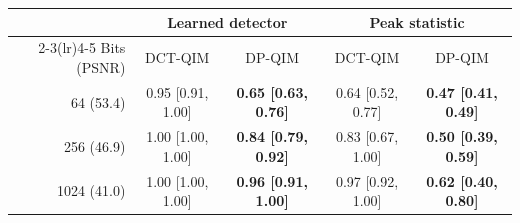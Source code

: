 \begin{tabular}{rcccc}
\toprule
 & \multicolumn{2}{c}{Learned detector} & \multicolumn{2}{c}{Peak statistic} \\
\cmidrule(lr){2-3}\cmidrule(lr){4-5}
Bits (PSNR) & DCT-QIM & DP-QIM & DCT-QIM & DP-QIM \\
\midrule
64 (53.4) & 0.95 [0.91, 1.00] & \textbf{0.65 [0.63, 0.76]} & 0.64 [0.52, 0.77] & \textbf{0.47 [0.41, 0.49]} \\
256 (46.9) & 1.00 [1.00, 1.00] & \textbf{0.84 [0.79, 0.92]} & 0.83 [0.67, 1.00] & \textbf{0.50 [0.39, 0.59]} \\
1024 (41.0) & 1.00 [1.00, 1.00] & \textbf{0.96 [0.91, 1.00]} & 0.97 [0.92, 1.00] & \textbf{0.62 [0.40, 0.80]} \\
\bottomrule
\end{tabular}
